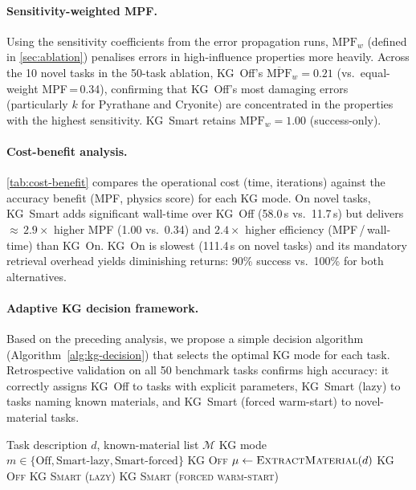 \documentclass[preprint,review,12pt]{elsarticle}
\begin{document}
\paragraph{Sensitivity-weighted MPF.}
Using the sensitivity coefficients from the error propagation runs,
$\text{MPF}_w$ (defined in \cref{sec:ablation}) penalises errors in
high-influence properties more heavily.  Across the 10 novel tasks in
the 50-task ablation, KG~Off's $\overline{\text{MPF}}_w{=}0.21$
(vs.\ equal-weight MPF\,=\,0.34), confirming that KG~Off's most
damaging errors (particularly $k$ for Pyrathane and Cryonite) are
concentrated in the properties with the highest sensitivity.
KG~Smart retains $\text{MPF}_w{=}1.00$ (success-only).

\paragraph{Cost-benefit analysis.}
\cref{tab:cost-benefit} compares the operational cost (time, iterations)
against the accuracy benefit (MPF, physics score) for each KG mode.
On novel tasks, KG~Smart adds significant wall-time over KG~Off
(58.0\,s vs.\ 11.7\,s) but delivers ${\approx}\,2.9\times$ higher
MPF (1.00 vs.\ 0.34) and $2.4\times$ higher efficiency
(MPF\,/\,wall-time) than KG~On.  KG~On is slowest (111.4\,s on novel
tasks) and its mandatory retrieval overhead yields diminishing returns:
90\% success vs.\ 100\% for both alternatives.



\paragraph{Adaptive KG decision framework.}
Based on the preceding analysis, we propose a simple decision algorithm
(Algorithm~\ref{alg:kg-decision}) that selects the optimal KG mode for
each task.  Retrospective validation on all 50 benchmark tasks
confirms high accuracy: it correctly assigns KG~Off to tasks with
explicit parameters, KG~Smart (lazy) to tasks naming known materials,
and KG~Smart (forced warm-start) to novel-material tasks.

\begin{algorithm}[t]
\caption{Adaptive KG Mode Selection}
\label{alg:kg-decision}
\begin{algorithmic}[1]
\Require Task description $d$, known-material list $\mathcal{M}$
\Ensure KG mode $m \in \{\text{Off}, \text{Smart-lazy}, \text{Smart-forced}\}$
  \State \Return \textsc{KG Off}
\EndIf
\State $\mu \gets \textsc{ExtractMaterial}(d)$
\If{$\mu = \varnothing$}
  \State \Return \textsc{KG Off}
  \State \Return \textsc{KG Smart (lazy)}
\Else
  \State \Return \textsc{KG Smart (forced warm-start)}
\EndIf
\end{algorithmic}
\end{algorithm}
\end{document}
